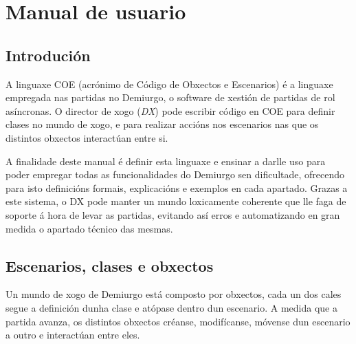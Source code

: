 \chapter{Manual de usuario}
\label{ch:manual}

\section{Introdución}
A linguaxe COE (acrónimo de Código de Obxectos e Escenarios) é a linguaxe
empregada nas partidas no Demiurgo, o software de xestión de
partidas de rol asíncronas. O director de xogo ({\it DX}) pode escribir código
en COE para definir clases no mundo de xogo, e para realizar accións nos escenarios nas que
os distintos obxectos interactúan entre si.
\par
A finalidade deste manual é definir esta linguaxe e ensinar a darlle uso para
poder empregar todas as funcionalidades do Demiurgo sen dificultade, ofrecendo
para isto definicións formais, explicacións e exemplos en cada apartado. Grazas
a este sistema, o DX pode manter un mundo loxicamente coherente que lle faga de
soporte á hora de levar as partidas, evitando así erros e automatizando en gran
medida o apartado técnico das mesmas.




\section{Escenarios, clases e obxectos}
Un mundo de xogo de Demiurgo está composto por obxectos, cada un dos cales
segue a definición dunha clase e atópase dentro dun escenario. A medida que
a partida avanza, os distintos obxectos créanse, modifícanse, móvense dun
escenario a outro e interactúan entre eles.

